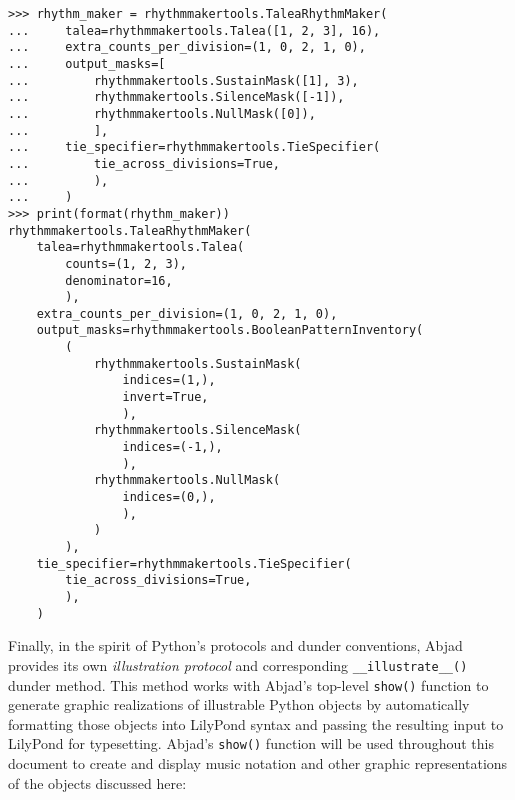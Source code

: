 \begin{comment}
<abjad>
rhythm_maker = rhythmmakertools.TaleaRhythmMaker(
    talea=rhythmmakertools.Talea([1, 2, 3], 16),
    extra_counts_per_division=(1, 0, 2, 1, 0),
    output_masks=[
        rhythmmakertools.SustainMask([1], 3),
        rhythmmakertools.SilenceMask([-1]),
        rhythmmakertools.NullMask([0]),
        ],
    tie_specifier=rhythmmakertools.TieSpecifier(
        tie_across_divisions=True,
        ),
    )
print(format(rhythm_maker))
</abjad>
\end{comment}

\begin{abjadbookoutput}
\begin{singlespacing}
\vspace{-0.5\baselineskip}
\begin{verbatim}
>>> rhythm_maker = rhythmmakertools.TaleaRhythmMaker(
...     talea=rhythmmakertools.Talea([1, 2, 3], 16),
...     extra_counts_per_division=(1, 0, 2, 1, 0),
...     output_masks=[
...         rhythmmakertools.SustainMask([1], 3),
...         rhythmmakertools.SilenceMask([-1]),
...         rhythmmakertools.NullMask([0]),
...         ],
...     tie_specifier=rhythmmakertools.TieSpecifier(
...         tie_across_divisions=True,
...         ),
...     )
>>> print(format(rhythm_maker))
rhythmmakertools.TaleaRhythmMaker(
    talea=rhythmmakertools.Talea(
        counts=(1, 2, 3),
        denominator=16,
        ),
    extra_counts_per_division=(1, 0, 2, 1, 0),
    output_masks=rhythmmakertools.BooleanPatternInventory(
        (
            rhythmmakertools.SustainMask(
                indices=(1,),
                invert=True,
                ),
            rhythmmakertools.SilenceMask(
                indices=(-1,),
                ),
            rhythmmakertools.NullMask(
                indices=(0,),
                ),
            )
        ),
    tie_specifier=rhythmmakertools.TieSpecifier(
        tie_across_divisions=True,
        ),
    )
\end{verbatim}
\end{singlespacing}
\end{abjadbookoutput}

\noindent Finally, in the spirit of Python's protocols and dunder conventions,
Abjad provides its own \emph{illustration protocol} and corresponding
\texttt{\_\_illustrate\_\_()} dunder method. This method works with Abjad's
top-level \texttt{show()} function to generate graphic realizations of
illustrable Python objects by automatically formatting those objects into
LilyPond syntax and passing the resulting input to LilyPond for typesetting.
Abjad's \texttt{show()} function will be used throughout this document to
create and display music notation and other graphic representations of the
objects discussed here:


